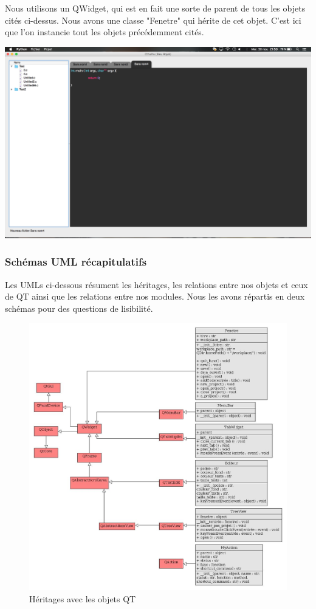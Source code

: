 \documentclass[a4paper,12pt]{article}
\begin{document}
				Nous utilisons un QWidget, qui est en fait une sorte de parent de tous les objets cités ci-dessus. Nous avons une classe "Fenetre" qui hérite de cet objet. C'est ici que l'on instancie tout les objets précédemment cités.\\
			\begin{center}
				\includegraphics[scale=0.2]{images/QWidget}
				\vspace{0.6cm}
			\end{center}
			
		\subsubsection*{Schémas UML récapitulatifs}
		
			Les UMLs ci-dessous résument les héritages, les relations entre nos objets et ceux de QT ainsi que les relations entre nos modules. Nous les avons répartis en deux schémas pour des questions de lisibilité.
			
			\begin{figure}[h!]
				\includegraphics[scale=0.45]{images/uml_module_gui_heritage}
				\caption{Héritages avec les objets QT}
			\end{figure}
			
\end{document}
